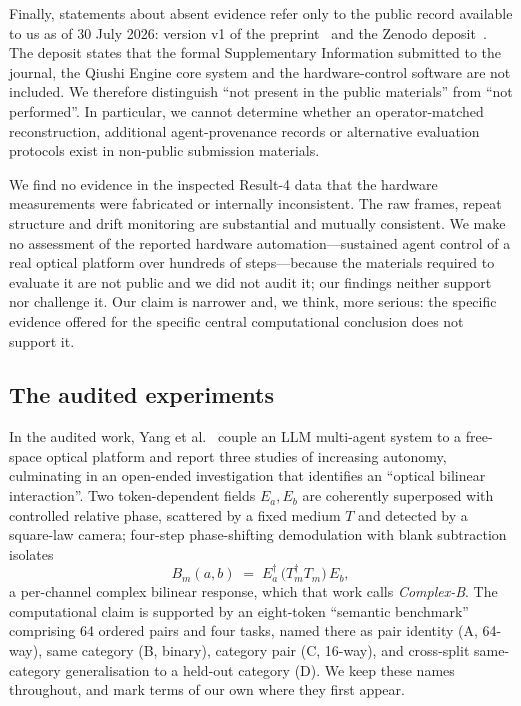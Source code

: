 \documentclass[11pt,a4paper]{article}
\begin{document}
Finally, statements about absent evidence refer only to the public record
available to us as of 30 July 2026: version v1 of the preprint~\cite{qiushi}
and the Zenodo deposit~\cite{zenodo}. The deposit states that the formal
Supplementary
Information submitted to the journal, the Qiushi Engine core system and the
hardware-control software are not included. We therefore distinguish ``not
present in the public materials'' from ``not performed''. In particular, we
cannot determine whether an operator-matched reconstruction, additional
agent-provenance records or alternative evaluation protocols exist in
non-public submission materials.


We find no evidence in the inspected Result-4 data that the hardware
measurements were fabricated or internally inconsistent. The raw frames,
repeat structure and drift monitoring are substantial and mutually consistent.
We make no assessment of the reported hardware automation---sustained agent
control of a real optical platform over hundreds of steps---because the
materials required to evaluate it are not public and we did not audit it; our
findings neither support nor challenge it. Our claim is narrower and, we
think, more serious: the specific evidence offered for the specific central
computational conclusion does not support it.

\subsection{The audited experiments}
\label{sec:setup}

In the audited work, Yang et al.~\cite{qiushi} couple an LLM multi-agent system to a
free-space optical platform and report three studies of increasing autonomy,
culminating in an open-ended investigation that identifies an ``optical
bilinear interaction''.
Two token-dependent fields $E_a,E_b$ are coherently superposed with controlled
relative phase, scattered by a fixed medium $T$ and detected by a square-law
camera; four-step phase-shifting demodulation with blank subtraction isolates
\begin{equation}
  B_m(a,b) \;=\; E_a^{\dagger}\,\bigl(T_m^{\dagger}T_m\bigr)\,E_b ,
  \label{eq:B}
\end{equation}
a per-channel complex bilinear response, which that work calls
\emph{Complex-B}. The computational claim is supported by an eight-token
``semantic benchmark'' comprising 64 ordered pairs and four tasks, named there
as pair identity (A, 64-way), same category (B, binary), category pair (C,
16-way), and cross-split same-category generalisation to a held-out category
(D). We keep these names throughout, and mark terms of our own where they
first appear.
\end{document}
